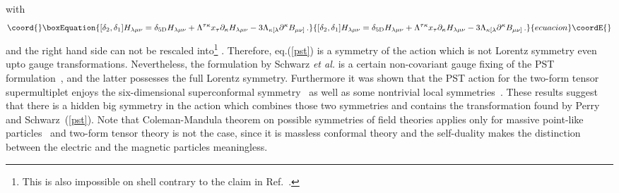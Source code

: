 \documentclass[a4paper,12pt]{article}
\begin{document}
with \coordHE{}
\begin{equation}\coord{}\boxEquation{
[\delta_{2},\delta_{1}]H_{\lambda\mu\nu}=\delta_{5{\rm D}}H_{\lambda\mu\nu}+\Lambda^{\tau\kappa}x_{\tau}\partial_{\kappa}H_{\lambda\mu\nu}-3\Lambda_{\kappa [\lambda}\partial^{\kappa}B_{\mu\nu]}\,.
}{
[\delta_{2},\delta_{1}]H_{\lambda\mu\nu}=\delta_{5{\rm D}}H_{\lambda\mu\nu}+\Lambda^{\tau\kappa}x_{\tau}\partial_{\kappa}H_{\lambda\mu\nu}-3\Lambda_{\kappa [\lambda}\partial^{\kappa}B_{\mu\nu]}\,.
}{ecuacion}\coordE{}\end{equation}
and the right hand side can not be rescaled into\footnote{This is also impossible on shell contrary to the claim in Ref.~\cite{9611065}.}  \coordHE{}.  Therefore,  eq.(\ref{pst}) is  a  symmetry of the action which is not Lorentz symmetry even upto gauge transformations. Nevertheless,  the formulation by Schwarz \textit{et al.} is a certain non-covariant gauge fixing of the PST formulation~\cite{9701037,9701166,9503182,9506109}, and  the latter possesses the full \coordHE{} Lorentz symmetry. Furthermore it was shown that the PST action for the two-form tensor supermultiplet enjoys the six-dimensional superconformal symmetry~\cite{9711161} as well as some nontrivial local  symmetries~\cite{9701037,9710127}.  These results suggest that there is a hidden big symmetry  in the action  which combines those two symmetries and contains the transformation found by Perry and Schwarz~(\ref{pst}).  Note that  Coleman-Mandula theorem on possible symmetries of field theories applies only for massive point-like particles~\cite{PR1591251} and \coordHE{} two-form tensor theory is not the case, since it is massless conformal theory and the self-duality makes the distinction between the electric and the magnetic particles meaningless. \newline
\end{document}
